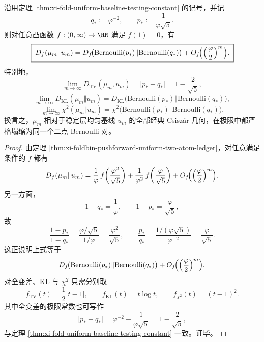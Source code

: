 \begin{corollary}\label{cor:xi-fold-uniform-baseline-classical-fdiv-bernoulli-collapse}
沿用定理 \ref{thm:xi-fold-uniform-baseline-testing-constant} 的记号，并记
\[
q_*:=\varphi^{-2},
\qquad
p_*:=\frac{1}{\varphi\sqrt5}.
\]
则对任意凸函数 \(f:(0,\infty)\to\RR\) 满足 \(f(1)=0\)，有
\[
\boxed{\;
D_f(\mu_m\Vert u_m)
=
D_f\!\bigl(\mathrm{Bernoulli}(p_*)\Vert \mathrm{Bernoulli}(q_*)\bigr)
+O_f\!\Bigl(\Bigl(\frac{\varphi}{2}\Bigr)^m\Bigr).\;}
\]
特别地，
\[
\boxed{\;
\lim_{m\to\infty}D_{\mathrm{TV}}(\mu_m,u_m)
=
\left|p_*-q_*\right|
=
1-\frac{2}{\sqrt5},\;}
\]
\[
\boxed{\;
\lim_{m\to\infty}D_{\mathrm{KL}}(\mu_m\Vert u_m)
=
D_{\mathrm{KL}}\!\bigl(\mathrm{Bernoulli}(p_*)\Vert \mathrm{Bernoulli}(q_*)\bigr),\;}
\]
\[
\boxed{\;
\lim_{m\to\infty}\chi^2(\mu_m\Vert u_m)
=
\chi^2\!\bigl(\mathrm{Bernoulli}(p_*)\Vert \mathrm{Bernoulli}(q_*)\bigr).\;}
\]
换言之，\(\mu_m\) 相对于稳定层均匀基线 \(u_m\) 的全部经典 Csisz\'ar 几何，在极限中都严格塌缩为同一个二点 Bernoulli 对。
\end{corollary}
\begin{proof}
由定理 \ref{thm:xi-foldbin-pushforward-uniform-two-atom-ledger}，对任意满足条件的 \(f\) 都有
\[
D_f(\mu_m\Vert u_m)
=
\frac1\varphi\,f\!\left(\frac{\varphi^2}{\sqrt5}\right)
+\frac1{\varphi^2}\,f\!\left(\frac{\varphi}{\sqrt5}\right)
+O_f\!\Bigl(\Bigl(\frac{\varphi}{2}\Bigr)^m\Bigr).
\]
另一方面，
\[
1-q_*=\frac1\varphi,
\qquad
1-p_*=\frac{\varphi}{\sqrt5},
\]
故
\[
\frac{1-p_*}{1-q_*}
=
\frac{\varphi/\sqrt5}{1/\varphi}
=
\frac{\varphi^2}{\sqrt5},
\qquad
\frac{p_*}{q_*}
=
\frac{1/(\varphi\sqrt5)}{\varphi^{-2}}
=
\frac{\varphi}{\sqrt5}.
\]
这正说明上式等于
\[
D_f\!\bigl(\mathrm{Bernoulli}(p_*)\Vert \mathrm{Bernoulli}(q_*)\bigr)
+O_f\!\Bigl(\Bigl(\frac{\varphi}{2}\Bigr)^m\Bigr).
\]
对全变差、KL 与 \(\chi^2\) 只需分别取
\[
f_{\mathrm{TV}}(t)=\frac12|t-1|,
\qquad
f_{\mathrm{KL}}(t)=t\log t,
\qquad
f_{\chi^2}(t)=(t-1)^2.
\]
其中全变差的极限常数也可写作
\[
|p_*-q_*|
=
\varphi^{-2}-\frac{1}{\varphi\sqrt5}
=
1-\frac{2}{\sqrt5},
\]
与定理 \ref{thm:xi-fold-uniform-baseline-testing-constant} 一致。证毕。
\end{proof}


